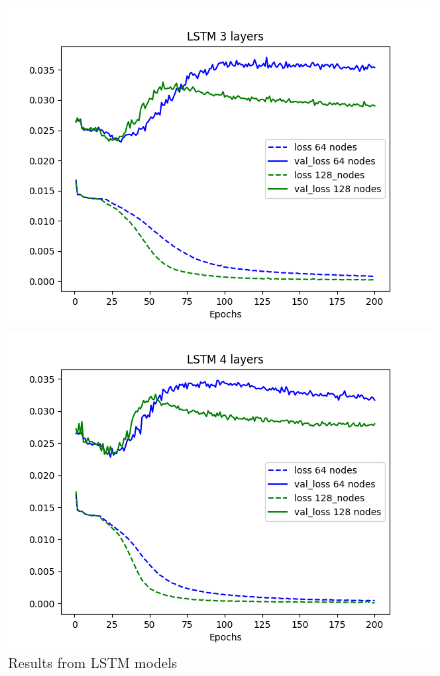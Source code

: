 \documentclass[11pt]
{article}
\begin{document}
\begin{figure}[H]
\begin{minipage}[b]{0.33\linewidth}
		\includegraphics[width=\linewidth]{../TESTS_RESULTS/LSTM_tests/plots/3_comp.png} 
	\end{minipage}%
	\begin{minipage}[b]{0.33\linewidth}
		\centering
		\includegraphics[width=\linewidth]{../TESTS_RESULTS/LSTM_tests/plots/4_comp.png} 
	\end{minipage} 
\caption{Results from LSTM models} 
\end{figure}
\end{document}
